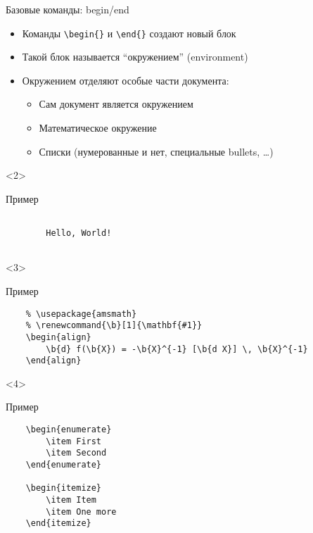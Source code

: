 \begin{frame}[fragile]{Базовые команды: begin/end}

\begin{itemize}
    \item Команды \lstinline!\begin{}! и \lstinline!\end{}! создают новый блок
    \item Такой блок называется ``окружением'' (environment)
    \item Окружением отделяют особые части документа: \pause
    \begin{itemize}[<+->]
        \item Сам документ является окружением
        \item Математическое окружение
        \item Списки (нумерованные и нет, специальные bullets, \dots)
    \end{itemize}
\end{itemize}

\begin{onlyenv}<2>
    \begin{block}{Пример}
        \begin{lstlisting}
    
        Hello, World!
    
        \end{lstlisting}
    \end{block}
\end{onlyenv}

\begin{onlyenv}<3>
    \begin{block}{Пример}
        \begin{lstlisting}
    % \usepackage{amsmath}
    % \renewcommand{\b}[1]{\mathbf{#1}}
    \begin{align}
        \b{d} f(\b{X}) = -\b{X}^{-1} [\b{d X}] \, \b{X}^{-1}
    \end{align}
        \end{lstlisting}
    \end{block}
\end{onlyenv}

\begin{onlyenv}<4>
    \begin{block}{Пример}
        \begin{lstlisting}
    \begin{enumerate}
        \item First
        \item Second
    \end{enumerate}
    
    \begin{itemize}
        \item Item
        \item One more
    \end{itemize}
        \end{lstlisting}
    \end{block}
\end{onlyenv}

\end{frame}